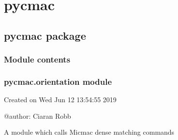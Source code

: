 \documentclass[letterpaper,10pt,english]{sphinxmanual}
\begin{document}
\begin{sphinxVerbatim}[commandchars=\\\{\}]
  


    \PYG{p}{[}  \PYG{p}{]}
\end{sphinxVerbatim}


\section{pycmac}
\label{\detokenize{modules:pycmac}}\label{\detokenize{modules::doc}}

\subsection{pycmac package}
\label{\detokenize{pycmac:pycmac-package}}\label{\detokenize{pycmac::doc}}

\subsubsection{Module contents}
\label{\detokenize{pycmac:module-contents}}

\subsubsection{pycmac.orientation module}
\label{\detokenize{pycmac:module-orientation}}\label{\detokenize{pycmac:pycmac-orientation-module}}
Created on Wed Jun 12 13:54:55 2019

@author: Ciaran Robb

A module which calls Micmac dense matching commands
\end{document}
